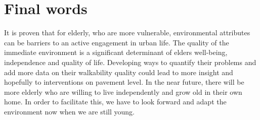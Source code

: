 \section{Final words}

It is proven that for elderly, who are more vulnerable, environmental attributes can be barriers to an active engagement in urban life. The quality of the immediate environment is a significant determinant of elders well-being, independence and quality of life. Developing ways to quantify their problems and add more data on their walkability quality could lead to more insight and hopefully to interventions on pavement level. In the near future, there will be more elderly who are willing to live independently and grow old in their own home. In order to facilitate this, we have to look forward and adapt the environment now when we are still young. 








 

